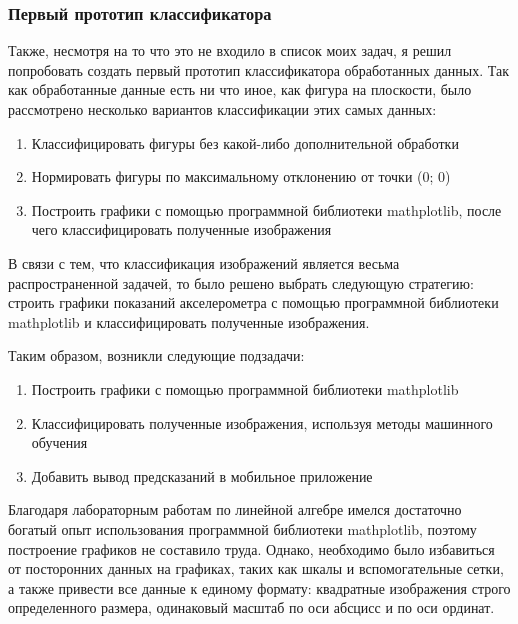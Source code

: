 
\subsubsection{Первый прототип классификатора}
Также, несмотря на то что это не входило в список моих задач, я решил попробовать создать первый прототип классификатора обработанных данных.
Так как обработанные данные есть ни что иное, как фигура на плоскости, было рассмотрено несколько вариантов классификации этих самых данных:
\begin{enumerate}
    \item Классифицировать фигуры без какой-либо дополнительной обработки
    \item Нормировать фигуры по максимальному отклонению от точки (0; 0)
    \item Построить графики с помощью программной библиотеки mathplotlib, после чего классифицировать полученные изображения
\end{enumerate}
В связи с тем, что классификация изображений является весьма распространенной задачей, то было решено выбрать следующую стратегию: строить графики показаний акселерометра с помощью программной библиотеки mathplotlib и классифицировать полученные изображения.

Таким образом, возникли следующие подзадачи:
\begin{enumerate}
    \item Построить графики с помощью программной библиотеки mathplotlib
    \item Классифицировать полученные изображения, используя методы машинного обучения
    \item Добавить вывод предсказаний в мобильное приложение
\end{enumerate}
Благодаря лабораторным работам по линейной алгебре имелся достаточно богатый опыт использования программной библиотеки mathplotlib, поэтому построение графиков не составило труда. Однако, необходимо было избавиться от посторонних данных на графиках, таких как шкалы и вспомогательные сетки, а также привести все данные к единому формату: квадратные изображения строго определенного размера, одинаковый масштаб по оси абсцисс и по оси ординат.

